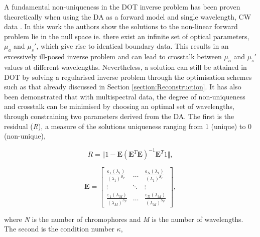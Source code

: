 \documentclass[twoside]{bhamthesis}
\theoremstyle{definition}
\begin{document}
A fundamental non-uniqueness in the DOT inverse problem has been proven theoretically when using the DA as a forward model and single wavelength, CW data \cite{arridge1998nonuniqueness,corlu2005diffuse}. 
In this work the authors show the solutions to the non-linear forward problem lie in the null space ie. there exist an infinite set of optical parameters, $\mu_a$ and $\mu_s'$, which give rise to identical boundary data. This results in an excessively ill-posed inverse problem and can lead to crosstalk between $\mu_a$ and $\mu_s'$ values at different wavelengths. Nevertheless, a solution can still be attained in DOT by solving a regularised inverse problem through the optimisation schemes such as that already discussed in Section \ref{section:Reconstruction}. 
It has also been demonstrated that with multispectral data, the degree of non-uniqueness and crosstalk can be minimised by choosing an optimal set of wavelengths, through constraining two parameters derived from the DA. The first is the residual (\textit{R}), a measure of the solutions uniqueness ranging from 1 (unique) to 0 (non-unique),

\begin{figure}[!ht]
	\begin{minipage}{.5\textwidth}
   \begin{equation}
R = \Vert1-\textbf{E}\left( \textbf{E}^T\textbf{E}\right)^{-1}\textbf{E}^T1\Vert,
  \label{eqn:Lambert-Bouger}
\end{equation}
  \end{minipage}%
  \begin{minipage}{.5\textwidth}
     \begin{equation}
	\mathrm{\textbf{E}} = \left[  \begin{matrix} \frac{\mathrm{\varepsilon_{1}}(\lambda_{1})} {(\lambda_{1})^{S_P}} & \dots &    \frac{\mathrm{\varepsilon_{N}}(\lambda_{1})} {(\lambda_{1})^{S_P}}
\\ \vdots &  \ddots & \vdots
\\\frac{\mathrm{\varepsilon_{1}}(\lambda_{M})} {(\lambda_{M})^{S_P}} & \dots &   \frac{\mathrm{\varepsilon_{N}}(\lambda_{M})} {(\lambda_{M})^{S_P}}
\end{matrix} \right],  
\label{eqn:Lambert-Bouger}
    \end{equation}
  \end{minipage}
\end{figure}

where \textit{N} is the number of chromophores and \textit{M} is the number of wavelengths. The second is the condition number $\kappa$, 
\end{document}
